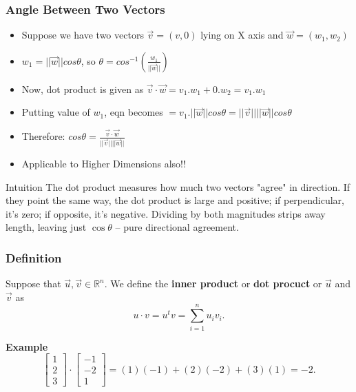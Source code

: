  \begin{frame}[fragile] \frametitle{Angle Between Two Vectors}

 \begin{itemize}
 
\item Suppose we have two vectors $\vec{v} = (v, 0)$ lying on X axis and $\vec{w}= (w_1,w_2)$
\item $w_1 = ||\vec{w}||cos\theta$, so $\theta = cos^{-1}(\frac{w_1}{||\vec{w}||})$
\item Now, dot product is given as $\vec{v}\cdot\vec{w} = v_1.w_1 + 0.w_2 = v_1.w_1$
\item Putting value of $w_1$, eqn becomes $= v_1.||\vec{w}||cos\theta = ||\vec{v}||||\vec{w}||cos\theta$
\item Therefore: $cos\theta = \frac{\vec{v}\cdot\vec{w}}{||\vec{v}||||\vec{w}||}$
\item Applicable to Higher Dimensions also!!
\end{itemize}

\begin{block}{Intuition}
The dot product measures how much two vectors "agree" in direction. If they point the same way, the dot product is large and positive; if perpendicular, it's zero; if opposite, it's negative. Dividing by both magnitudes strips away length, leaving just $\cos\theta$ -- pure directional agreement.
\end{block}

\end{frame}

\begin{frame}[fragile] \frametitle{Definition}

Suppose that $\vec{u}, \vec{v}\in \mathbb R^n$.  We define the
 \textbf{inner product} or \textbf{dot procuct} or $\vec{u}$ and $\vec{v}$ as
 $$
 u\cdot v = u^tv=\sum_{i=1}^n u_i v_i.
 $$


\textbf{Example}
$$
 \left[ \begin{array}{r} 1\\2\\3 \end{array}\right] \cdot   \left[\begin{array}{r} -1\\-2\\1 \end{array}\right] =
 (1)(-1) + (2)(-2) + (3)(1) = -2.
 $$

\end{frame}

